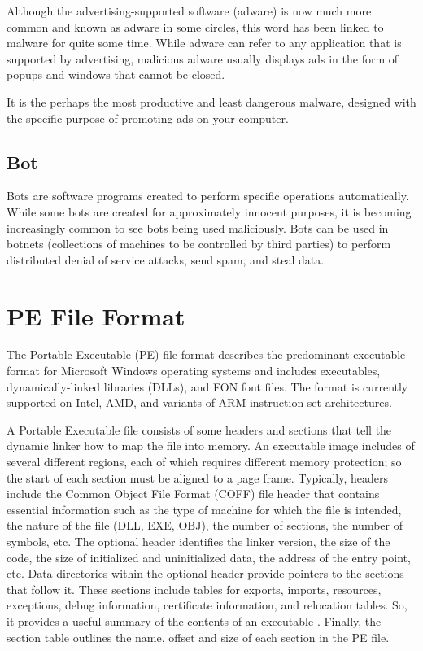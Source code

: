 Although the advertising-supported software (adware) is now much more common and known as adware in some circles, this word has been linked to malware for quite some time. While adware can refer to any application that is supported by advertising, malicious adware usually displays ads in the form of popups and windows that cannot be closed.

It is the perhaps the most productive and least dangerous malware, designed with the specific purpose of promoting ads on your computer.

\subsection{Bot}

Bots are software programs created to perform specific operations automatically. While some bots are created for approximately innocent purposes, it is becoming increasingly common to see bots being used maliciously. Bots can be used in botnets (collections of machines to be controlled by third parties) to perform distributed denial of service attacks, send spam, and steal data.

\section{PE File Format}
\label{sec:pe-file}

The Portable Executable (PE) file format describes the predominant executable format for Microsoft Windows operating systems and includes executables, dynamically-linked libraries (DLLs), and FON font files. The format is currently supported on Intel, AMD, and variants of ARM instruction set architectures.

A Portable Executable file consists of some headers and sections that tell the dynamic linker how to map the file into memory. An executable image includes of several different regions, each of which requires different memory protection; so the start of each section must be aligned to a page frame. Typically, headers include the Common Object File Format (COFF) file header that contains essential information such as the type of machine for which the file is intended, the nature of the file (DLL, EXE, OBJ), the number of sections, the number of symbols, etc. The optional header identifies the linker version, the size of the code, the size of initialized and uninitialized data, the address of the entry point, etc. Data directories within the optional header provide pointers to the sections that follow it. These sections include tables for exports, imports, resources, exceptions, debug information, certificate information, and relocation tables. So, it provides a useful summary of the contents of an executable \cite{shafiq2009pe}. Finally, the section table outlines the name, offset and size of each section in the PE file.

